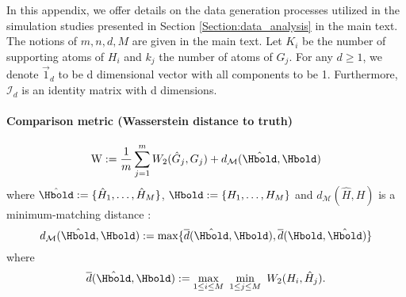 In this appendix, we offer details on the data generation processes 
utilized in the simulation studies presented in Section \ref{Section:data_analysis} in the main text. %
The notions of $m, n, d, M$ are given in the main text. 
Let $K_i$ be the number of supporting atoms of $H_i$ and $k_{j}$
the number of atoms of $G_{j}$. For any $d \geq 1$, we denote $\vec{1}_{d}$ to be d dimensional vector with all components to be 1. Furthermore, $\mathcal{I}_{d}$ is an identity matrix with d dimensions. 

\paragraph{Comparison metric (Wasserstein distance to truth)}
\begin{eqnarray}
\text{W}:= \frac{1}{m}\sum_{j=1}^m W_2(\hat G_j, G_j) + d_{\mathcal{M}}(\hat {\Hbold}, \Hbold) \nonumber
\end{eqnarray}
where $\hat{\Hbold} := \{\hat H_1,\ldots,\hat H_M\}$, $\Hbold := \{H_1,\ldots,H_M\}$ and $d_{\mathcal{M}}(\hat H, H)$ is a minimum-matching distance \cite{tang2014understanding, Nguyen-2015}:
$$d_{\mathcal{M}}(\hat{\Hbold}, \Hbold) := \max\{\overline{d}(\hat{\Hbold}, \Hbold), \overline{d}(\Hbold, \hat{\Hbold})\}$$
where
$$\overline{d}(\hat{\Hbold}, \Hbold) := \max\limits_{1 \leq i \leq M}\,\,\min\limits_{1 \leq j \leq M} \,\, W_2(H_{i},\hat H_{j}).$$

